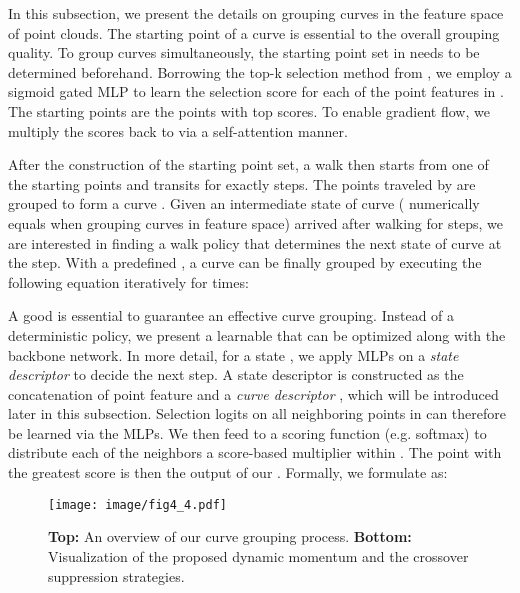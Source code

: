 \documentclass[10pt,twocolumn,letterpaper]{article}
\theoremstyle{definition}
\begin{document}
In this subsection, we present the details on grouping curves in the feature space of point clouds. The starting point of a curve is essential to the overall grouping quality. To group  curves simultaneously, the starting point set in  needs to be determined beforehand. Borrowing the top-k selection method from \cite{gao2019graph}, we employ a sigmoid gated MLP to learn the selection score for each of the point features in . The starting points are the points with top  scores. To enable gradient flow, we multiply the scores back to  via a self-attention manner.

After the construction of the starting point set, a walk  then starts from one of the starting points  and transits for exactly  steps. The points traveled by  are grouped to form a curve . Given an intermediate state of curve  ( numerically equals  when grouping curves in feature space) arrived after walking for  steps, we are interested in finding a walk policy  that determines the next state of curve at the  step. With a predefined , a curve  can be finally grouped by executing the following equation iteratively for  times:




A good  is essential to guarantee an effective curve grouping. Instead of a deterministic policy, we present a learnable  that can be optimized along with the backbone network. In more detail, for a state , we apply MLPs on a \textit{state descriptor}  to decide the next step. A state descriptor is constructed as the concatenation of point feature  and a \textit{curve descriptor} , which will be introduced later in this subsection. Selection logits  on all neighboring points in  can therefore be learned via the MLPs. We then feed  to a scoring function (e.g. softmax) to distribute each of the neighbors a score-based multiplier within . The point with the greatest score is then the output of our . Formally, we formulate  as:





\begin{figure}[t]
	\begin{center}
\texttt{[image: image/fig4\_4.pdf]}
	\end{center}
	\caption{\textbf{Top:} An overview of our curve grouping process. \textbf{Bottom:} Visualization of the proposed dynamic momentum and the crossover suppression strategies.}
	\label{fig:4}
\end{figure}
\end{document}
